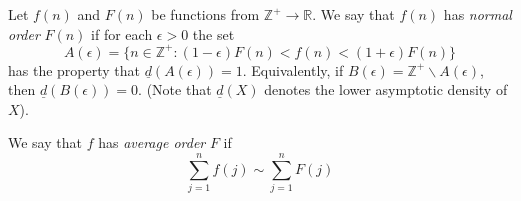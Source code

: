 \documentclass[12pt]{article}
\begin{document}
Let $f(n)$ and $F(n)$ be functions from $\mathbb{Z}^{+} \rightarrow \mathbb{R}$.  We say that $f(n)$ has {\em normal order} $F(n)$ if for each $\epsilon>0$ the
set
\[ A(\epsilon)=\{n \in \mathbb{Z}^{+} :
     (1-\epsilon)F(n)<f(n)<(1+\epsilon)F(n) \} \]
has the property that $\underline{d}(A(\epsilon))=1$.
Equivalently, if $B(\epsilon)=\mathbb{Z}^{+} \backslash A(\epsilon)$, then
 $\underline{d}(B(\epsilon))=0$.  (Note that $\underline{d}(X)$ denotes the lower asymptotic density of $X$).

We say that $f$ has {\em average order} $F$ if
\[ \sum_{j=1}^n f(j) \sim \sum_{j=1}^n F(j) \]
\end{document}
